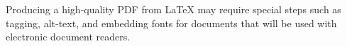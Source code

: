 Producing a high-quality PDF from LaTeX may require special steps such as tagging, alt-text, and embedding fonts for documents that will be used with electronic document readers.
